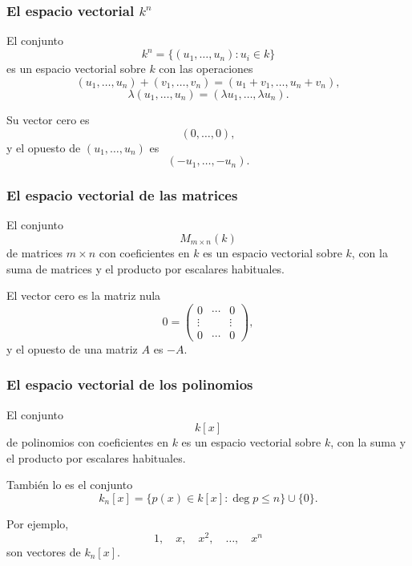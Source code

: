 \begin{frame}
    \frametitle{El espacio vectorial \(k^n\)}

    \begin{example}
        El conjunto
        \[
            k^n=\{(u_1,\ldots,u_n):u_i\in k\}
        \]
        es un espacio vectorial sobre \(k\) con las operaciones
        \[
            (u_1,\ldots,u_n)+(v_1,\ldots,v_n)
            =
            (u_1+v_1,\ldots,u_n+v_n),
        \]
        \[
            \lambda(u_1,\ldots,u_n)
            =
            (\lambda u_1,\ldots,\lambda u_n).
        \]
    \end{example}

    \medskip

    Su vector cero es
    \[
        (0,\ldots,0),
    \]
    y el opuesto de \((u_1,\ldots,u_n)\) es
    \[
        (-u_1,\ldots,-u_n).
    \]
\end{frame}


\begin{frame}
    \frametitle{El espacio vectorial de las matrices}

    \begin{example}
        El conjunto
        \[
            M_{m\times n}(k)
        \]
        de matrices \(m\times n\) con coeficientes en \(k\) es un espacio vectorial
        sobre \(k\), con la suma de matrices y el producto por escalares habituales.
    \end{example}

    \medskip

    El vector cero es la matriz nula
    \[
        0=
        \begin{pmatrix}
            0 & \cdots & 0\\
            \vdots & & \vdots\\
            0 & \cdots & 0
        \end{pmatrix},
    \]
    y el opuesto de una matriz \(A\) es \(-A\).
\end{frame}


\begin{frame}
    \frametitle{El espacio vectorial de los polinomios}

    \begin{example}
        El conjunto
        \[
            k[x]
        \]
        de polinomios con coeficientes en \(k\) es un espacio vectorial sobre \(k\),
        con la suma y el producto por escalares habituales.
    \end{example}

    \medskip

    También lo es el conjunto
    \[
        k_n[x]
        =
        \{p(x)\in k[x]:\deg p\leq n\}\cup\{0\}.
    \]

    \medskip

    Por ejemplo,
    \[
        1,\quad x,\quad x^2,\quad \ldots,\quad x^n
    \]
    son vectores de \(k_n[x]\).
\end{frame}


